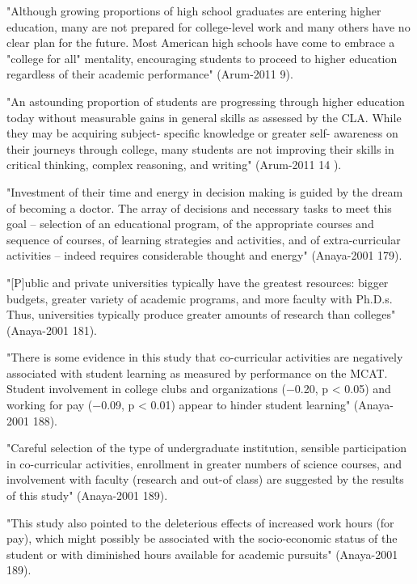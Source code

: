 
"Although growing proportions of high school graduates are entering higher education, many are not prepared for college-level work and many others have no clear plan for the future. Most American high schools have come to embrace a "college for all" mentality, encouraging students to proceed to higher education regardless of their academic performance" (Arum-2011 9).


"An astounding proportion of students are progressing through higher education today without measurable gains in general skills as assessed by the CLA. While they may be acquiring subject- specific knowledge or greater self- awareness on their journeys through college, many students are not improving their skills in critical thinking, complex reasoning, and writing" (Arum-2011 14 ).


"Investment of their time and energy in decision making is guided by the dream of becoming a doctor. The array of decisions and necessary tasks to meet this goal – selection of an educational program, of the appropriate courses and sequence of courses, of learning strategies and activities, and of extra-curricular activities – indeed requires considerable thought and energy" (Anaya-2001 179).

"[P]ublic and private universities typically have the greatest resources: bigger budgets, greater variety of academic programs, and more faculty with Ph.D.s. Thus, universities typically produce greater amounts of research than colleges" (Anaya-2001 181).

"There is some evidence in this study that co-curricular activities are negatively associated with student learning as measured by performance on the MCAT. Student involvement in college clubs and organizations (−0.20, p < 0.05) and working for pay (−0.09, p < 0.01) appear to hinder student learning" (Anaya-2001 188).

"Careful selection of the type of undergraduate institution, sensible participation in co-curricular activities, enrollment in greater numbers of science courses, and involvement with faculty (research and out-of class) are suggested by the results of this study" (Anaya-2001 189).

"This study also pointed to the deleterious effects of increased work hours (for pay), which might possibly be associated with the socio-economic status of the student or with diminished hours available for academic pursuits" (Anaya-2001 189).


